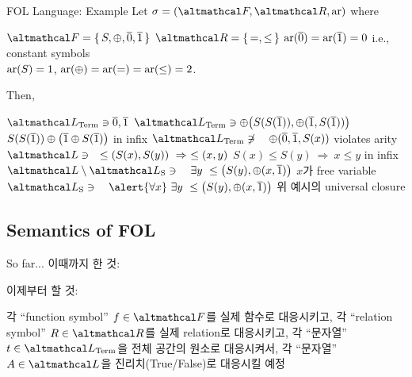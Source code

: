 \documentclass[../231120_msquare_computational-logic.tex]{subfiles}
\begin{document}
\begin{frame}{FOL Language: Example}
    Let \(\sigma = (\mcal F, \mcal R, \mrm{ar})\) where
    \begin{itemize}
        \ii \(\mcal F = \{\,S, \oplus, \ol 0, \ol 1\,\}\)
        \ii \(\mcal R = \{\,=, \le\,\}\)
        \ii \(\mathrm{ar}(\overline 0) = \mathrm{ar}(\overline 1) = 0\) \hfill i.e., \alert{constant symbols} \\
            \(\mathrm{ar}(S) = 1\), \(\mathrm{ar}(\oplus) = \mathrm{ar}(=) = \mathrm{ar}(\le) = 2\).
    \end{itemize}

    Then,
    \begin{itemize}
        \ii \(\mcal L_\text{Term} \ni \ol 0, \ol 1\)
        \ii \(\mcal L_\text{Term} \ni \oplus \big(S(S(\ol 1)), \oplus(\ol 1, S(\ol 1))\big)\)
            \hfill {\footnotesize\(S(S(\overline 1)) \oplus \big( \overline 1 \oplus S(\overline 1) \big)\) in infix}
        \ii \(\mcal L_\text{Term} \not\ni \quad \oplus (\ol 0, \ol 1, S(x))\)
            \hfill {\footnotesize violates arity}
        \ii \(\mcal L \ni \quad\le (S(x), S(y)) \ \Rightarrow\ \le (x, y)\)
            \hfill {\footnotesize\(S(x) \le S(y) \ \Rightarrow\ x \le y\) in infix}
        \ii \(\mcal L \setminus \mcal L_\text{S} \ni \quad \exs y\ \le \big(S(y), \oplus(x, \ol 1)\big)\) 
            \hfill {\footnotesize \(x\)가 free variable}
        \ii \(\mcal L_\text{S} \ni \quad \alert{\forall x}\ \exs y\ \le \big(S(y), \oplus(x, \ol 1)\big)\) 
            \hfill {\footnotesize 위 예시의 \alert{universal closure}}
    \end{itemize}
\end{frame}

\subsection{Semantics of FOL}
\begin{frame}{So far...}
    이때까지 한 것:
    \begin{center}
    \end{center}
    \pause

    \begin{alertblock}{}
        이제부터 할 것:
        \begin{itemize}
            \ii 각 ``function symbol'' \(f \in \mcal F\)를 실제 함수로 대응시키고,
            \ii 각 ``relation symbol'' \(R \in \mcal R\)를 실제 relation로 대응시키고,
            \ii 각 ``문자열'' \(t \in \mcal L_\text{Term}\)을 전체 공간의 원소로 대응시켜서,
            \ii 각 ``문자열'' \(A \in \mcal L\)을 진리치(True/False)로 대응시킬 예정
        \end{itemize}
    \end{alertblock}

    \begin{center}
    \end{center}
\end{frame}
\end{document}
